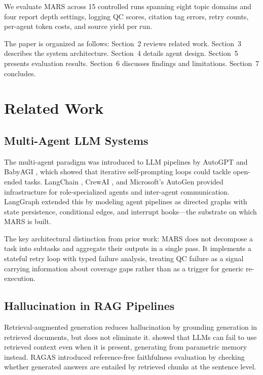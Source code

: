 \documentclass[11pt]{article}
\begin{document}
We evaluate MARS across 15 controlled runs spanning eight topic domains and four
report depth settings, logging QC scores, citation tag errors, retry counts,
per-agent token costs, and source yield per run.

\vspace{0.5em}
The paper is organized as follows: Section~2 reviews related work. Section~3
describes the system architecture. Section~4 details agent design. Section~5
presents evaluation results. Section~6 discusses findings and limitations.
Section~7 concludes.

\section{Related Work}

\subsection{Multi-Agent LLM Systems}

The multi-agent paradigm was introduced to LLM pipelines by AutoGPT
\citep{toran2023autogpt} and BabyAGI \citep{nakajima2023babyagi}, which showed
that iterative self-prompting loops could tackle open-ended tasks. LangChain
\citep{chase2022langchain}, CrewAI \citep{moura2024crewai}, and Microsoft's
AutoGen \citep{wu2023autogen} provided infrastructure for role-specialized agents
and inter-agent communication. LangGraph \citep{langgraph2024} extended this by
modeling agent pipelines as directed graphs with state persistence, conditional
edges, and interrupt hooks---the substrate on which MARS is built.

The key architectural distinction from prior work: MARS does not decompose a task
into subtasks and aggregate their outputs in a single pass. It implements a
stateful retry loop with typed failure analysis, treating QC failure as a signal
carrying information about coverage gaps rather than as a trigger for generic
re-execution.

\subsection{Hallucination in RAG Pipelines}

Retrieval-augmented generation \citep{lewis2020rag} reduces hallucination by
grounding generation in retrieved documents, but does not eliminate it.
\citet{shi2023irrelevant} showed that LLMs can fail to use retrieved context even
when it is present, generating from parametric memory instead. RAGAS
\citep{es2023ragas} introduced reference-free faithfulness evaluation by checking
whether generated answers are entailed by retrieved chunks at the sentence level.
\end{document}

